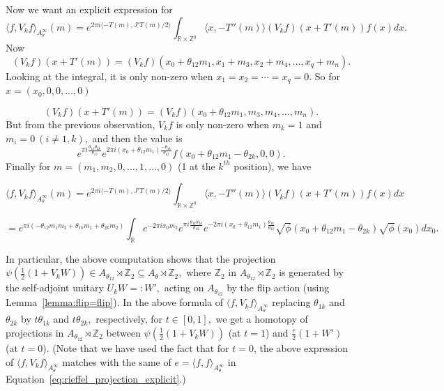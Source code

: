 \documentclass[9pt, BCOR=2mm]{amsart}
\numberwithin{equation}{section}
\numberwithin{equation}{section}
\newcommand{\Z}{{\mathbb{Z}}}
\newcommand{\R}{{\mathbb{R}}}
\begin{document}
  
  Now we want an explicit expression for 
 $$\langle f,V_kf\rangle_{A^\infty_{\theta}}(m)=e^{2\pi i\langle -T(m),J'T(m)\slash2\rangle}\int_{\R \times \Z^q}\langle x,-T''(m)\rangle (V_kf)(x+T'(m))f(x)dx.$$ 
Now $$(V_kf)(x+T'(m))=(V_kf)(x_0+\theta_{12}m_1,x_1+m_3,x_2+m_4, \ldots, x_q+m_n).$$ Looking at the integral, it is only non-zero when $x_1=x_2=\cdots=x_q=0.$ So for $x=(x_0,0,0,\ldots,0)$
 
 $$(V_kf)(x+T'(m))=(V_kf)(x_0+\theta_{12}m_1,m_3,m_4,\ldots, m_n).$$ But from the previous observation, $V_kf$ is only non-zero when $m_k=1$ and $m_i=0 ~(i \neq 1,k),$ and then the value is 
 $$ e^{\pi i\frac{\theta_{1k}\theta_{2k}}{\theta_{12}}}e^{2\pi i(x_0+\theta_{12}m_1)\frac{-\theta_{1k}}{\theta_{12}}} f(x_0+\theta_{12}m_1-\theta_{2k},0,0).$$
 Finally for $m=(m_1,m_2,0,\ldots, 1,\ldots, 0)$ (1 at the $k^{th}$ position), we have 
 
 
 
 
  $$\langle f,V_kf\rangle_{A^\infty_{\theta}}(m)=e^{2\pi i\langle -T(m),J'T(m)\slash2\rangle}\int_{\R \times \Z^q}\langle x,-T''(m)\rangle (V_kf)(x+T'(m))f(x)dx$$ 
  
  $$= e^{\pi i(-\theta_{12}m_1m_2+\theta_{1k}m_1+\theta_{2k}m_2)}\int_{\R}e^{-2\pi ix_0m_2} e^{\pi i\frac{\theta_{1k}\theta_{2k}}{\theta_{12}}}e^{-2\pi i(x_0+\theta_{12}m_1)\frac{\theta_{1k}}{\theta_{12}}} \sqrt{\phi}(x_0+\theta_{12}m_1-\theta_{2k})\sqrt{\phi}(x_0)dx_0.$$
  
  In particular, the above computation shows that the projection $\psi(\frac{1}{2}(1+V_kW))\in A_{\theta_{12}}\rtimes\Z_2 \subseteq A_{\theta}\rtimes\Z_2,$ where $\Z_2$ in $A_{\theta_{12}}\rtimes\Z_2$ is generated by the self-adjoint unitary $U_kW=:W',$ acting on $A_{\theta_{12}}$ by the flip action (using Lemma~\ref{lemma:flip=flip}). In the above formula of $\langle f,V_kf\rangle_{A^\infty_{\theta}}$ replacing $\theta_{1k}$ and $\theta_{2k}$ by $t\theta_{1k}$ and $t\theta_{2k},$ respectively, for $t\in [0,1],$ we get a homotopy of projections in $A_{\theta_{12}}\rtimes\Z_2$ between $\psi(\frac{1}{2}(1+V_kW))$ (at $t=1$) and $\frac{e}{2}(1+W')$ (at $t=0$). (Note that we have used the fact that for $t=0$, the above expression of $\langle f,V_kf\rangle_{A^\infty_{\theta}}$ matches with the same of $e=\langle f,f\rangle_{A^\infty_{\theta}}$ in Equation~\ref{eq:rieffel_projection_explicit}.)        
  
\end{document}
